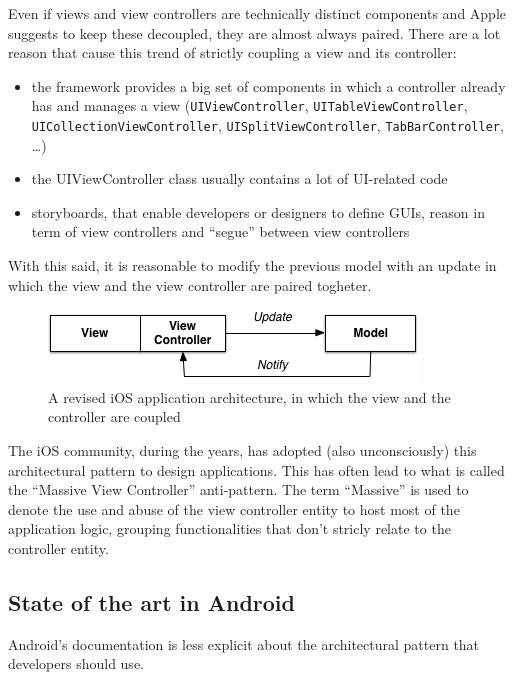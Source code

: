 Even if views and view controllers are technically distinct components
and Apple suggests to keep these decoupled, they are almost always
paired. There are a lot reason that cause this trend of strictly
coupling a view and its controller:

\begin{itemize}
\itemsep1pt\parskip0pt
\item
  the framework provides a big set of components in which a controller
  already has and manages a view (\texttt{UIViewController},
  \texttt{UITableViewController}, \texttt{UICollectionViewController},
  \texttt{UISplitViewController}, \texttt{TabBarController}, \ldots{})
\item
  the UIViewController class usually contains a lot of UI-related code
\item
  storyboards, that enable developers or designers to define GUIs,
  reason in term of view controllers and ``segue'' between view
  controllers
\end{itemize}

With this said, it is reasonable to modify the previous model with an
update in which the view and the view controller are paired togheter.

\begin{figure}[htbp]
\centering
\includegraphics[scale=0.75]{imgs/real_mvc.png}
\caption{A revised iOS application architecture, in which the view and
the controller are coupled}
\end{figure}

The iOS community, during the years, has adopted (also unconsciously)
this architectural pattern to design applications. This has often lead
to what is called the ``Massive View Controller'' anti-pattern. The term
``Massive'' is used to denote the use and abuse of the view controller
entity to host most of the application logic, grouping functionalities
that don't stricly relate to the controller entity.

\subsection{State of the art in
Android}\label{state-of-the-art-in-android}

Android's documentation is less explicit about the architectural pattern
that developers should use.


